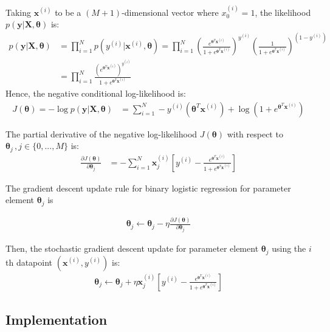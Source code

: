 \documentclass[11pt]{exam}
\numberwithin{equation}{section} %
\numberwithin{figure}{section} %
\numberwithin{table}{section} %
\def\x{\mathbf x}
\def\y{\mathbf y}
\newcommand{\thetav     }{\boldsymbol \theta     }
\begin{document}
Taking $\x^{\left(i\right)}$ to be a $(M+1)$-dimensional vector where $x^{(i)}_0=1$, the likelihood $p\left(\y|\mathbf{X},\thetav\right)$ is:
\begin{align}
     p(\y |\mathbf{X},\thetav) &= \prod_{i = 1}^N p(y^{(i)} | \x^{(i)}, \thetav) = \prod_{i = 1}^N \left(\frac{e^{\thetav^T\x^{\left(i\right)}}}{1+e^{\thetav^T\x^{\left(i\right)}}}\right)^{y^{(i)}}\left(\frac{1}{1+e^{\thetav^T\x^{\left(i\right)}}}\right)^{\left(1-y^{(i)}\right)}\\
    &= \prod_{i=1}^N \frac{\left(e^{\thetav^T\x^{\left(i\right)}}\right)^{y^{(i)}}}{1+e^{\thetav^T\x^{\left(i\right)}}}
\end{align}
Hence, the negative conditional log-likelihood is:
\begin{align}
    J(\thetav)= -\log p\left(\y|\mathbf{X},\thetav\right) &= \sum_{i=1}^N  -y^{(i)}\left(\thetav^T\x^{\left(i\right)}\right)+\log\left(1+e^{\thetav^T\x^{\left(i\right)}}\right)
\end{align}


The partial derivative of the negative log-likelihood $J(\thetav)$ with respect to $\thetav_j \,, j\in\{0,...,M\}$ is:
\begin{align}
    \frac{\partial J(\thetav)}{\partial \thetav_j} &= -\sum_{i=1}^N \x_j^{\left(i\right)}\left[y^{(i)}-\frac{e^{\thetav^T\x^{\left(i\right)}}}{1+e^{\thetav^T\x^{\left(i\right)}}}\right]
\end{align}


The gradient descent update rule  for binary logistic regression for parameter element $\thetav_j$ is

\begin{align}
    \thetav_j \leftarrow \thetav_j - \eta \frac{\partial J(\thetav)}{\partial \thetav_j}
\end{align}


Then, the stochastic gradient descent update for  parameter element $\thetav_j$ using the $i$th datapoint $(\x^{(i)},y^{(i)})$ is:
\begin{align}
    \thetav_j \leftarrow \thetav_j + \eta \x_j^{\left(i\right)}\left[y^{(i)}-\frac{e^{\thetav^T\x^{\left(i\right)}}}{1+e^{\thetav^T\x^{\left(i\right)}}}\right]
\end{align}
 


\subsection{Implementation}
\end{document}
